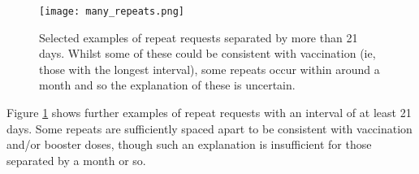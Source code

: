 \documentclass[review]{elsarticle}
\begin{document}
\begin{figure}[H]
\centering
\texttt{[image: many\_repeats.png]}
\caption{Selected examples of repeat requests separated by more than 21 days. Whilst some of these could be consistent with vaccination (ie, those with the longest interval), some repeats occur within around a month and so the explanation of these is uncertain.}
\label{many_repeats}
\end{figure}

Figure \ref{many_repeats} shows further examples of repeat requests with an interval of at least 21 days. Some repeats are sufficiently spaced apart to be consistent with vaccination and/or booster doses, though such an explanation is insufficient for those separated by a month or so. 




\end{document}
